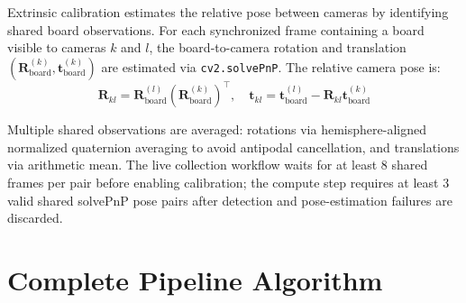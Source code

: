 \documentclass[11pt,a4paper]{article}
\begin{document}
Extrinsic calibration estimates the relative pose between cameras by identifying
shared board observations. For each synchronized frame containing a board visible to
cameras $k$ and $l$, the board-to-camera rotation and translation
$(\mathbf{R}^{(k)}_\text{board}, \mathbf{t}^{(k)}_\text{board})$ are estimated via
\texttt{cv2.solvePnP}. The relative camera pose is:
\[
  \mathbf{R}_{kl} = \mathbf{R}^{(l)}_\text{board} (\mathbf{R}^{(k)}_\text{board})^\top,
  \quad \mathbf{t}_{kl} = \mathbf{t}^{(l)}_\text{board} - \mathbf{R}_{kl}\mathbf{t}^{(k)}_\text{board}
\]

Multiple shared observations are averaged: rotations via hemisphere-aligned normalized
quaternion averaging to avoid antipodal cancellation, and translations via arithmetic
mean. The live collection workflow waits for at least 8 shared frames per pair before
enabling calibration; the compute step requires at least 3 valid shared solvePnP pose
pairs after detection and pose-estimation failures are discarded.

\section{Complete Pipeline Algorithm}
\end{document}
